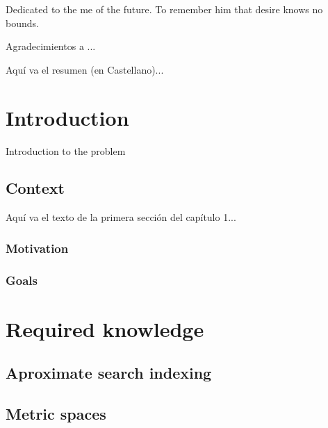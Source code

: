 \documentclass{iccmemoria}
\author{Erik Regla}
\date{month, year}
\begin{document}
\maketitle

\begin{dedicatory}
Dedicated to the me of the future. To remember him that desire knows no bounds.
\end{dedicatory}

\begin{acknowledgment}
Agradecimientos a ...
\end{acknowledgment}

\tableofcontents
\listoffigures
\listoftables

\begin{resumen}
Aquí va el resumen (en Castellano)... 
\end{resumen}



\chapter{Introduction}
Introduction to the problem

\section{Context}
Aquí va el texto de la primera sección del capítulo 1... 

\subsection{Motivation}


\subsection{Goals}

\chapter{Required knowledge}
  \section{Aproximate search indexing}
  \section{Metric spaces}
\end{document}
